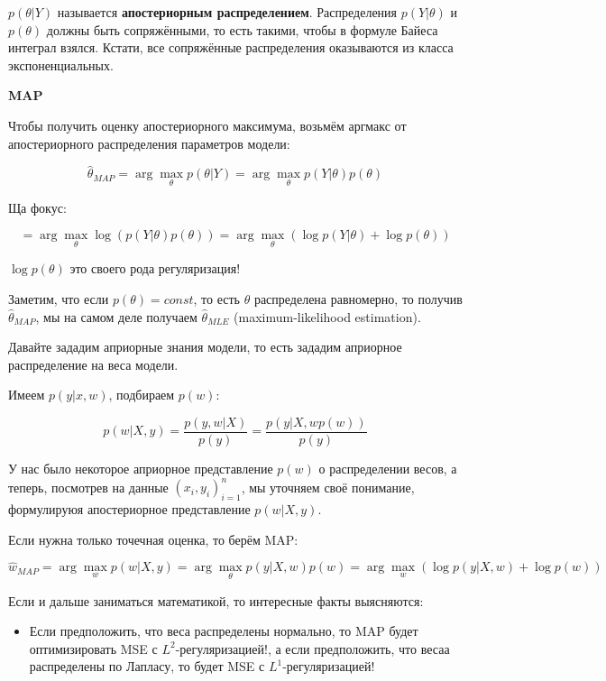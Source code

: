 \documentclass[12pt]{article}
\begin{document}
\begin{itemize}
    $p(\theta | Y)$ называется \textbf{апостериорным распределением}. Распределения $p(Y|\theta)$ и $p(\theta)$ должны быть сопряжёнными, то есть такими, чтобы в формуле Байеса интеграл взялся. Кстати, все сопряжённые распределения оказываются из класса экспоненциальных.

    \textbf{MAP}

    Чтобы получить оценку апостериорного максимума, возьмём аргмакс от апостериорного распределения параметров модели:

    \[ \hat{\theta}_{MAP} = \arg \max_{\theta} p (\theta | Y) = \arg \max_{\theta} p(Y|\theta) p(\theta) \]

    Ща фокус:

    \[ = \arg \max_{\theta} \log \left( p(Y|\theta) p(\theta) \right) = \arg \max_{\theta} \left( \log p(Y|\theta) + \log p(\theta) \right)\]

    $\log p(\theta)$ это своего рода регуляризация!

    Заметим, что если $p(\theta) = const$, то есть $\theta$ распределена равномерно, то получив $\hat{\theta}_{MAP}$, мы на самом деле получаем $\hat{\theta}_{MLE}$ (maximum-likelihood estimation).

    Давайте зададим априорные знания модели, то есть зададим априорное распределение на веса модели.

    Имеем $p(y|x, w)$, подбираем $p(w)$:

    \[ p(w|X,y) = \frac{p(y,w|X)}{p(y)} = \frac{p(y|X,wp(w))}{p(y)} \]

    У нас было некоторое априорное представление $p(w)$ о распределении весов, а теперь, посмотрев на данные $(x_i, y_i)_{i=1}^n$, мы уточняем своё понимание, формулируюя апостериорное представление $p(w|X,y)$.

    Если нужна только точечная оценка, то берём MAP:

    \[ \hat{w}_{MAP} = \arg \max_{w} p (w | X, y) = \arg \max_{\theta} p(y|X, w) p(w) = \arg \max_{w} \left( \log p(y|X, w) + \log p(w) \right) \]

    Если и дальше заниматься математикой, то интересные факты выясняются:

    \begin{itemize}
        \item Если предположить, что веса распределены нормально, то MAP будет оптимизировать MSE с $L^2$-регуляризацией!, а если предположить, что весаа распределены по Лапласу, то будет MSE с $L^1$-регуляризацией!
    \end{itemize}


\end{itemize}
\end{document}
